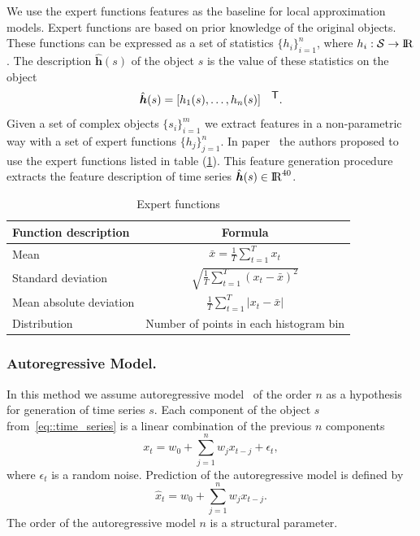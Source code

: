 \documentclass{llncs}
\newcommand{\T}{{\mbox{\footnotesize\sffamily\upshape\mdseries T}}}
\begin{document}
We use the expert functions features as the baseline for local approximation models.
Expert functions are based on prior knowledge of the original objects. 
These functions can be expressed as a set of statistics $\{h_i\}_{i=1}^n$, where $h_i: \mathcal{S} \rightarrow {\rm I\!R}$.
The description $\hat{\bm{h}}(s)$ of the object $s$ is the value of these statistics on the object 
\[
\hat{\bm{h}}(s) = [h_1(s), \dots, h_n(s)]^{\T}.
\]
Given a set of complex objects $\{s_i\}_{i=1}^m$ we extract features in a non-parametric way with a set of expert functions $\{h_j\}_{j=1}^n$.
In paper~\cite{kwapisz2011activity} the authors proposed to use the expert functions listed in table (\ref{tbl::expert_functions}).
This feature generation procedure extracts the feature description of time series $\hat{\bm{h}}(s) \in {\rm I\!R}^{40}$.

\begin{table}[h]
	\centering
	\caption{Expert functions}
	\begin{tabular}{|l|c|}
		\hline
		\textbf{Function description}    & \textbf{Formula} \\ \hline
		Mean                    & $\bar{x} = \frac{1}{T} \sum_{t=1}^{T} x_t$    \\ \hline
		Standard deviation      & $\sqrt{\frac{1}{T} \sum_{t=1}^{T} (x_t - \bar{x})^2}$    \\ \hline
		Mean absolute deviation & $\frac{1}{T} \sum_{t=1}^{T} |x_t - \bar{x}|$    \\ \hline
		Distribution            & Number of points in each histogram bin    \\ \hline
	\end{tabular}
	\label{tbl::expert_functions}
\end{table}

\subsubsection{Autoregressive Model.}
In this method we assume autoregressive model~\cite{lukashin2003adaptive} of the order $n$ as a hypothesis for generation of time series $s$. 
Each component of the object $s$ from~\eqref{eq::time_series} is a linear combination of the previous $n$ components 
\begin{equation*}
x_t = w_0 + \sum_{j=1}^{n} w_j x_{t-j} + \epsilon_t,
\end{equation*}
where $\epsilon_t$ is a random noise. 
Prediction of the autoregressive model is defined by
\begin{equation}
\hat{x}_t = w_0 + \sum_{j=1}^{n} w_j x_{t-j}.
\label{eq::autoregression_prediction}
\end{equation}
The order of the autoregressive model $n$ is a structural parameter. 
\end{document}
